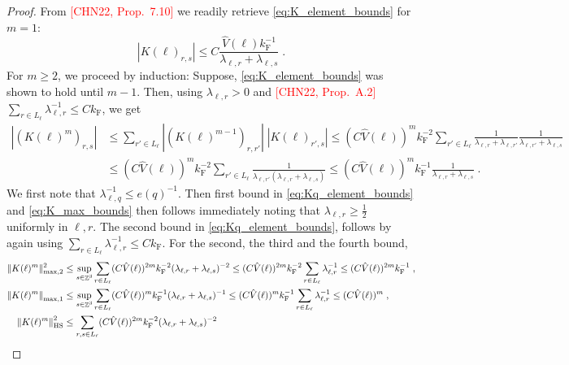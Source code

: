\documentclass[sn-mathphys, Numbered ,a4paper]{sn-jnl}%
\DeclareMathOperator{\Z}{\mathbb{Z}}
\newcommand{\F}{\mathrm{F}}
\newcommand{\normmaxi}[1]{\norm{#1}_{\mathrm{max,1}}}
\theoremstyle{plain}
\theoremstyle{definition}
\theoremstyle{remark}
\theoremstyle{plain}
\theoremstyle{definition}
\theoremstyle{remark}
\begin{document}
\begin{proof}
From \textcolor{red}{[CHN22, Prop.~7.10]} we readily retrieve \eqref{eq:K_element_bounds} for $ m = 1 $:
\begin{equation}
	|K(\ell)_{r,s}|
	\le C \frac{\hat{V}(\ell) k_{\F}^{-1}}{\lambda_{\ell,r} + \lambda_{\ell,s}} \;.
\end{equation}
For $ m \ge 2 $, we proceed by induction: Suppose, \eqref{eq:K_element_bounds} was shown to hold until $ m-1 $. Then, using $ \lambda_{\ell,r} > 0 $ and \textcolor{red}{[CHN22, Prop.~A.2]} $ \sum_{r \in L_\ell} \lambda_{\ell,r}^{-1} \le C k_{\F} $, we get
\begin{equation}
	\begin{aligned}
		|(K(\ell)^m)_{r,s}|
		&\le \sum_{r' \in L_\ell}
		|(K(\ell)^{m-1})_{r,r'}| \;
		|K(\ell)_{r',s}|
		\le (C \hat{V}(\ell))^m k_{\F}^{-2} \sum_{r' \in L_\ell}
		\frac{1}{\lambda_{\ell, r} + \lambda_{\ell, r'}}
		\frac{1}{\lambda_{\ell, r'} + \lambda_{\ell, s}} \\
		&\le (C \hat{V}(\ell))^m k_{\F}^{-2} \sum_{r' \in L_\ell}
		\frac{1}{\lambda_{\ell, r'} (\lambda_{\ell, r} + \lambda_{\ell, s})}
		\le (C \hat{V}(\ell))^m k_{\F}^{-1}
		\frac{1}{\lambda_{\ell, r} + \lambda_{\ell, s}} \;.
	\end{aligned}
\end{equation}
We first note that $\lambda^{-1}_{\ell,q}\leq e(q)^{-1}$. Then first bound in \eqref{eq:Kq_element_bounds} and \eqref{eq:K_max_bounds} then follows immediately noting that $ \lambda_{\ell,r} \ge \frac 12 $ uniformly in $ \ell, r $. The second bound in \eqref{eq:Kq_element_bounds}, follows by again using $ \sum_{r \in L_\ell} \lambda_{\ell,r}^{-1} \le C k_{\F} $. For the second, the third and the fourth bound,
\begin{equation} \label{eq:max2_HS_bound}
\begin{aligned}
	\Vert K(\ell)^m \Vert_{\mathrm{max},2}^2
	&\le \sup_{s \in \Z^3} \sum_{r \in L_\ell} (C \hat{V}(\ell))^{2m} k_{\F}^{-2} (\lambda_{\ell,r} + \lambda_{\ell,s})^{-2}
	\le (C \hat{V}(\ell))^{2m} k_{\F}^{-2} \sum_{r \in L_\ell} \lambda_{\ell,r}^{-1}
	\le (C \hat{V}(\ell))^{2m} k^{-1}_{\F} \;, \\
	\normmaxi{K(\ell)^m} 
	&\leq \sup_{s \in \Z^3} \sum_{r \in L_\ell} (C \hat{V}(\ell))^{m} k_{\F}^{-1} (\lambda_{\ell,r} + \lambda_{\ell,s})^{-1} \le (C \hat{V}(\ell))^{m} k_{\F}^{-1} \sum_{r \in L_\ell} \lambda_{\ell,r}^{-1} \leq (C \hat{V}(\ell))^{m} \;,\\
	\norm{K(\ell)^m}_{\mathrm{HS}}^2
	&\le \sum_{r,s \in L_\ell} (C \hat{V}(\ell))^{2m} k_{\F}^{-2} (\lambda_{\ell,r} + \lambda_{\ell,s})^{-2}

\end{aligned}
\end{equation}
\end{proof}
\end{document}
